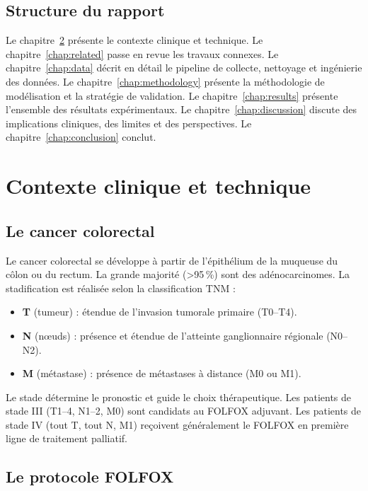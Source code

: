 \documentclass[12pt,a4paper]{report}
\begin{document}
\section{Structure du rapport}

Le chapitre~\ref{chap:background} présente le contexte clinique et technique. Le chapitre~\ref{chap:related} passe en revue les travaux connexes. Le chapitre~\ref{chap:data} décrit en détail le pipeline de collecte, nettoyage et ingénierie des données. Le chapitre~\ref{chap:methodology} présente la méthodologie de modélisation et la stratégie de validation. Le chapitre~\ref{chap:results} présente l'ensemble des résultats expérimentaux. Le chapitre~\ref{chap:discussion} discute des implications cliniques, des limites et des perspectives. Le chapitre~\ref{chap:conclusion} conclut.

\chapter{Contexte clinique et technique}
\label{chap:background}

\section{Le cancer colorectal}

Le cancer colorectal se développe à partir de l'épithélium de la muqueuse du côlon ou du rectum. La grande majorité (>95\,\%) sont des adénocarcinomes. La stadification est réalisée selon la classification TNM :
\begin{itemize}
  \item \textbf{T} (tumeur) : étendue de l'invasion tumorale primaire (T0--T4).
  \item \textbf{N} (nœuds) : présence et étendue de l'atteinte ganglionnaire régionale (N0--N2).
  \item \textbf{M} (métastase) : présence de métastases à distance (M0 ou M1).
\end{itemize}
Le stade détermine le pronostic et guide le choix thérapeutique. Les patients de stade III (T1--4, N1--2, M0) sont candidats au FOLFOX adjuvant. Les patients de stade IV (tout T, tout N, M1) reçoivent généralement le FOLFOX en première ligne de traitement palliatif.

\section{Le protocole FOLFOX}
\end{document}
